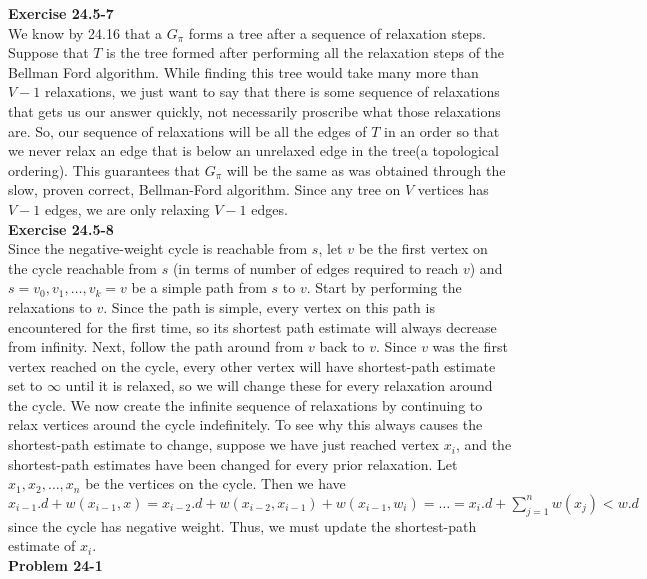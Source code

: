 \documentclass{article}
\begin{document}
\noindent\textbf{Exercise 24.5-7}\\

We know by 24.16 that a $G_\pi$ forms a tree after a sequence of relaxation steps. Suppose that $T$ is the tree formed after performing all the relaxation steps of the Bellman Ford algorithm. While finding this tree would take many more than $V-1$ relaxations, we just want to say that there is some sequence of relaxations that gets us our answer quickly, not necessarily proscribe what those relaxations are. So, our sequence of relaxations will be all the edges of $T$ in an order so that we never relax an edge that is below an unrelaxed edge in the tree(a topological ordering). This guarantees that $G_\pi$ will be the same as was obtained through the slow, proven correct, Bellman-Ford algorithm. Since any tree on $V$ vertices has $V-1$ edges, we are only relaxing $V-1$ edges.\\

\noindent\textbf{Exercise 24.5-8}\\

Since the negative-weight cycle is reachable from $s$, let $v$ be the first vertex on the cycle reachable from $s$ (in terms of number of edges required to reach $v$) and $s = v_0, v_1, \ldots, v_k = v$ be a simple path from $s$ to $v$.  Start by performing the relaxations to $v$. Since the path is simple, every vertex on this path is encountered for the first time, so its shortest path estimate will always decrease from infinity.  Next, follow the path around from $v$ back to $v$.  Since $v$ was the first vertex reached on the cycle, every other vertex will have shortest-path estimate set to $\infty$ until it is relaxed, so we will change these for every relaxation around the cycle.  We now create the infinite sequence of relaxations by continuing to relax vertices around the cycle indefinitely. To see why this always causes the shortest-path estimate to change, suppose we have just reached vertex $x_i$, and the shortest-path estimates have been changed for every prior relaxation.  Let $x_1, x_2, \ldots, x_n$ be the vertices on the cycle. Then we have $x_{i-1}.d + w(x_{i-1}, x) = x_{i-2}.d + w(x_{i-2}, x_{i-1}) + w(x_{i-1}, w_i) = \ldots = x_i.d + \sum_{j=1}^n w(x_j) < w.d$ since the cycle has negative weight.  Thus, we must update the shortest-path estimate of $x_i$.\\


\noindent\textbf{Problem 24-1}\\
\end{document}
